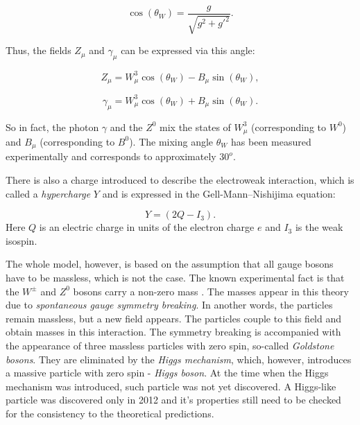 \begin{equation}
 \cos(\theta_{W}) = \frac{g}{\sqrt{g^{2}+g'^{2}}}.
\end{equation}

Thus, the fields $Z_{\mu}$ and $\gamma_{\mu}$ can be expressed via this angle:

\begin{equation}
 Z_{\mu} = W^{3}_{\mu}\cos(\theta_{W}) - B_{\mu}\sin(\theta_{W}),
\end{equation}

\begin{equation}
 \gamma_{\mu} = W^{3}_{\mu}\cos(\theta_{W}) + B_{\mu}\sin(\theta_{W}).
\end{equation}

So in fact, the photon $\gamma$ and the $Z^{0}$ mix the states of $W^{3}_{\mu}$ (corresponding to $W^{0}$) and $B_{\mu}$ (corresponding to $B^{0}$).
The mixing angle $\theta_{W}$ has been measured experimentally \cite{PDG-2012} and corresponds to approximately $30^{o}$.

There is also a charge introduced to describe the electroweak interaction, which is called a \textit{hypercharge} $Y$ and is expressed in the Gell-Mann--Nishijima
equation:

\begin{equation}
 Y = (2Q - I_{3}).
\end{equation}Here $Q$ is an electric charge in units of the electron charge $e$ and $I_{3}$ is the weak isospin.

The whole model, however, is based on the assumption that all gauge bosons have to be massless, which is not the case. The known experimental fact
is that the $W^{\pm}$ and $Z^{0}$ bosons carry a non-zero mass \cite{PDG-2012}. The masses appear in this theory due to \textit{spontaneous gauge symmetry
breaking}. In another words, the particles remain massless, but a new field appears. The particles couple to this field and obtain masses in this
interaction. The symmetry breaking is accompanied with the appearance of three massless particles with zero spin, so-called \textit{Goldstone bosons}.
They are eliminated by the \textit{Higgs mechanism}\cite{1964PhRvL..13..508H}, which, however, introduces a massive particle with zero spin - \textit{Higgs boson}. At the time when the
Higgs mechanism was introduced, such particle was not yet discovered. A Higgs-like particle was discovered only in 2012 \cite{Aad20121, Chatrchyan:2012xdj} 
and it's properties still need to be checked for the consistency to the theoretical predictions.


